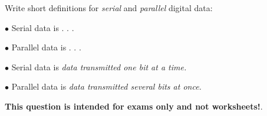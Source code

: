 

Write short definitions for {\it serial} and {\it parallel} digital data:

\medskip
\item{$\bullet$} Serial data is . . .
\vskip 40pt
\item{$\bullet$} Parallel data is . . .
\medskip







\medskip
\item{$\bullet$} Serial data is {\it data transmitted one bit at a time.}
\vskip 10pt
\item{$\bullet$} Parallel data is {\it data transmitted several bits at once.}
\medskip







{\bf This question is intended for exams only and not worksheets!}.




